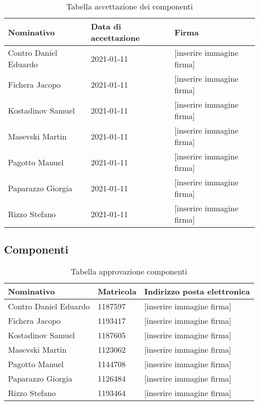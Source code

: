 \documentclass[../piano_di_progetto.tex]{subfiles}
\begin{document}
\begin{center}
	\begin{table}[!h]
	\begin{tabular}{|l|l|l|}
		\hline
		\rowcolor{lightgray}
		\textbf{Nominativo} & \textbf{Data di accettazione} & \textbf{Firma} \\ 
		\hline
		Contro Daniel Eduardo & 2021-01-11 & [inserire immagine firma] \\ 
		\hline
		Fichera Jacopo & 2021-01-11 & [inserire immagine firma] \\ 
		\hline
		Kostadinov Samuel & 2021-01-11 & [inserire immagine firma] \\
		\hline
		Masevski Martin & 2021-01-11 & [inserire immagine firma] \\ 
		\hline
		Pagotto Manuel & 2021-01-11 & [inserire immagine firma]  \\ 
		\hline
		Paparazzo Giorgia & 2021-01-11 & [inserire immagine firma] \\
		\hline
		Rizzo Stefano & 2021-01-11 &[inserire immagine firma] \\ 
		\hline

	\end{tabular}
		\caption{Tabella accettazione dei componenti}
	\end{table}
\end{center}

\subsection{Componenti}%
\label{sub:comp}

\begin{center}
	\begin{table}[!h]
	\begin{tabular}{|l|l|l|}
		\hline
		\rowcolor{lightgray}
		\textbf{Nominativo} & \textbf{Matricola} & \textbf{Indirizzo posta elettronica} \\ 
		\hline
		Contro Daniel Eduardo & 1187597 & [inserire immagine firma] \\ 
		\hline
		Fichera Jacopo & 1193417  & [inserire immagine firma] \\ 
		\hline
		Kostadinov Samuel & 1187605 & [inserire immagine firma] \\ 
		\hline
		Masevski Martin & 1123062 & [inserire immagine firma] \\ 
		\hline
		Pagotto Manuel & 1144708 & [inserire immagine firma]  \\ 
		\hline
		Paparazzo Giorgia & 1126484 & [inserire immagine firma] \\ 
		\hline
		Rizzo Stefano & 1193464 & [inserire immagine firma] \\ 
		\hline

	\end{tabular}
		\caption{Tabella approvazione componenti}
	\end{table}
\end{center}
\end{document}
